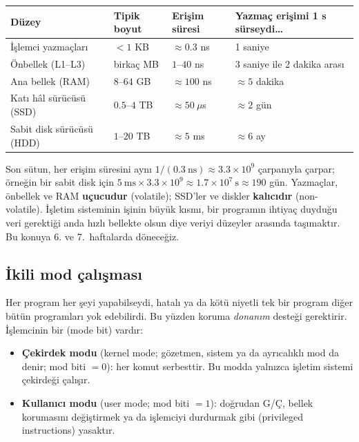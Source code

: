 \begin{center}
\renewcommand{\arraystretch}{1.3}
\begin{tabular}{@{}llll@{}}
\toprule
\textbf{Düzey} & \textbf{Tipik boyut} & \textbf{Erişim süresi} & \textbf{Yazmaç erişimi 1 s sürseydi\dots} \\
\midrule
İşlemci yazmaçları & $< 1$ KB & $\approx 0.3$ ns & 1 saniye \\
Önbellek (L1--L3) & birkaç MB & $1$--$40$ ns & 3 saniye ile 2 dakika arası \\
Ana bellek (RAM) & $8$--$64$ GB & $\approx 100$ ns & $\approx 5$ dakika \\
Katı hâl sürücüsü (SSD) & $0.5$--$4$ TB & $\approx 50\ \mu$s & $\approx 2$ gün \\
Sabit disk sürücüsü (HDD) & $1$--$20$ TB & $\approx 5$ ms & $\approx 6$ ay \\
\bottomrule
\end{tabular}
\end{center}

Son sütun, her erişim süresini aynı $1/(0.3\ \text{ns}) \approx 3.3\times10^{9}$ çarpanıyla çarpar; örneğin bir sabit disk için $5\ \text{ms} \times 3.3\times10^{9} \approx 1.7\times10^{7}\ \text{s} \approx 190$ gün. Yazmaçlar, önbellek ve RAM \textbf{uçucudur} (volatile); SSD'ler ve diskler \textbf{kalıcıdır} (non-volatile). İşletim sisteminin işinin büyük kısmı, bir programın ihtiyaç duyduğu veri gerektiği anda hızlı bellekte olsun diye veriyi düzeyler arasında taşımaktır. Bu konuya 6. ve 7.\ haftalarda döneceğiz.

\subsection{İkili mod çalışması}
\label{sec:dualmode}

Her program her şeyi yapabilseydi, hatalı ya da kötü niyetli tek bir program diğer bütün programları yok edebilirdi. Bu yüzden koruma \emph{donanım} desteği gerektirir. İşlemcinin bir  (mode bit) vardır:

\begin{itemize}
  \item \textbf{Çekirdek modu} (kernel mode; gözetmen, sistem ya da ayrıcalıklı mod da denir; mod biti $=0$): her komut serbesttir. Bu modda yalnızca işletim sistemi çekirdeği çalışır.
  \item \textbf{Kullanıcı modu} (user mode; mod biti $=1$): doğrudan G/Ç, bellek korumasını değiştirmek ya da işlemciyi durdurmak gibi  (privileged instructions) yasaktır.
\end{itemize}

